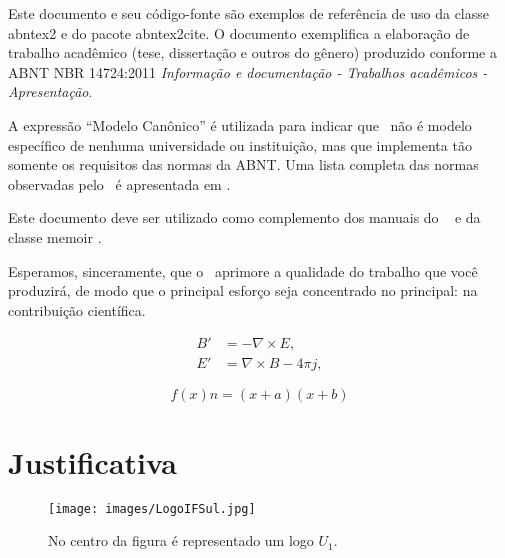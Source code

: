 

Este documento e seu código-fonte são exemplos de referência de uso da classe \textsf{abntex2} e do pacote \textsf{abntex2cite}. O documento exemplifica a elaboração de trabalho acadêmico (tese, dissertação e outros do gênero) produzido conforme a ABNT NBR 14724:2011 \emph{Informação e documentação - Trabalhos acadêmicos - Apresentação}.

A expressão ``Modelo Canônico'' é utilizada para indicar que \abnTeX\ não é modelo específico de nenhuma universidade ou instituição, mas que implementa tão somente os requisitos das normas da ABNT. Uma lista completa das normas observadas pelo \abnTeX\ é apresentada em .


Este documento deve ser utilizado como complemento dos manuais do \abnTeX\ \cite{abntex2classe,abntex2cite,abntex2cite-alf} e da classe \textsf{memoir} \cite{memoir}. 

Esperamos, sinceramente, que o \abnTeX\ aprimore a qualidade do trabalho que você produzirá, de modo que o principal esforço seja concentrado no principal: na contribuição científica.


\begin{align}
  B'&=-\nabla \times E,\\
  E'&=\nabla \times B - 4\pi j,
\end{align}

\begin{equation} 
 f(x) n=(x+a)(x+b)
\end{equation}

\section{Justificativa}

\begin{figure}[htp]
	\centering
	\caption{\label{fig:met-disc-fig01} No centro da figura é representado um logo $U_1$.} 
	\texttt{[image: images/LogoIFSul.jpg]}
\end{figure}

